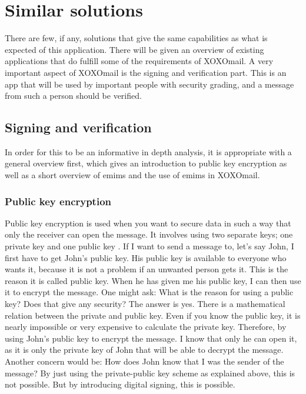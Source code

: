 

\section{Similar solutions}
There are few, if any, solutions that give the same capabilities as what is expected of this application. There will be given an overview of existing applications that do fulfill some of the requirements of XOXOmail.
\newline
\newline
A very important aspect of XOXOmail is the signing and verification part. This is an app that will be used by important people with security grading, and a message from such a person should be verified.

\subsection{Signing and verification}
In order for this to be an informative in depth analysis, it is appropriate with a general overview first, which gives an introduction to public key encryption as well as a short overview of \gls{emims} and the use of \gls{emims} in XOXOmail.

\subsubsection{Public key encryption}
Public key encryption is used when you want to secure data in such a way that only the receiver can open the message. It involves using two separate keys; one private key and one public key \cite{bib:pke}.
\newline
\newline
If I want to send a message to, let's say John, I first have to get John's public key. His public key is available to everyone who wants it, because it is not a problem if an unwanted person gets it. This is the reason it is called public key. When he has given me his public key, I can then use it to encrypt the message. One might ask: What is the reason for using a
public key? Does that give any security? The answer is yes. There is a mathematical relation between the private and public key. Even if you know the public key, it is nearly impossible or very expensive to calculate the private key. Therefore, by using John's public key to encrypt the message. I know that only he can open it, as it is only the private key of John that will be able to decrypt the message.
\newline
\newline
Another concern would be: How does John know that I was the sender of the message? By just using the private-public key scheme as explained above, this is not possible. But by introducing digital signing, this is possible.

